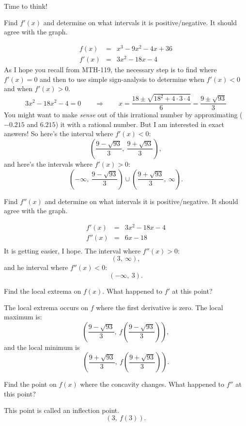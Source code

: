 \documentclass[12pt,addpoints, answers, fleqn]{exam}
\begin{document}
Time to think!
\begin{questions}
\question Find $f'\left(x \right)$ and determine on what intervals it is positive/negative. It should agree with the graph.
\begin{solution}
\begin{eqnarray*}
f \left( x \right) &=& x^3 - 9 x^2 - 4x +36\\
     f' \left( x \right)              &=& 3x^2 - 18 x - 4
\end{eqnarray*}
As I hope you recall from MTH-119, the necessary step is to find where  $f' \left( x \right) =0$ and then to use simple sign-analysis to determine when $f' \left( x \right) < 0$ and when $f' \left( x \right) > 0$.
\[
3x^2 - 18 x^2 - 4 = 0 \qquad \Rightarrow \qquad x = \frac{18 \pm \sqrt{18^2 + 4 \cdot 3 \cdot 4}}{6} = \frac{9 \pm \sqrt{93}}{3}
\]
You might want to make \emph{sense} out of this irrational number by approximating ($-0.215$ and $6.215$) it with a rational number. But I am interested in exact answers! So here's the interval where $f' \left( x \right) < 0$:
\[
\left( \frac{9 - \sqrt{93}}{3}, \ \frac{9 + \sqrt{93}}{3}\right),
\]
and here's the intervals where $f' \left( x \right) > 0$:
\[
\left( -\infty, \ \frac{9 - \sqrt{93}}{3}\right) \cup \left( \frac{9 + \sqrt{93}}{3}, \  \infty \right).
\]
\end{solution}

\question Find $f''\left(x \right)$ and determine on what intervals it is positive/negative. It should agree with the graph.

\begin{solution}
\begin{eqnarray*}
     f' \left( x \right)              &=& 3x^2 - 18 x - 4\\
          f'' \left( x \right)              &=& 6x - 18\\
\end{eqnarray*}
It is getting easier, I hope. The interval where $f'' \left( x \right) > 0$:
\[
\left( 3, \ \infty \right),
\]
and he interval where $f'' \left( x \right) < 0$:
\[
\left( -\infty, \ 3\right).
\]
\end{solution}

\question Find the local extrema on $f\left(x \right)$. What happened to $f'$ at this point?
\begin{solution}
The local extrema occurs on $f$ where the first derivative is zero. The local maximum is:
\[
\left( \frac{9 - \sqrt{93}}{3}, \ f \left( \frac{9 - \sqrt{93}}{3} \right) \right),
\]
and the local minimum is
\[
\left( \frac{9 + \sqrt{93}}{3}, \ f \left( \frac{9 + \sqrt{93}}{3} \right) \right).
\]
\end{solution}

\question Find the point on $f\left(x \right)$ where the concavity changes.  What happened to $f''$ at this point?

\begin{solution}
This point is called an inflection point.
\[
\left( 3, \ f \left( 3 \right) \right).
\]
\end{solution}

\end{questions}
\end{document}
